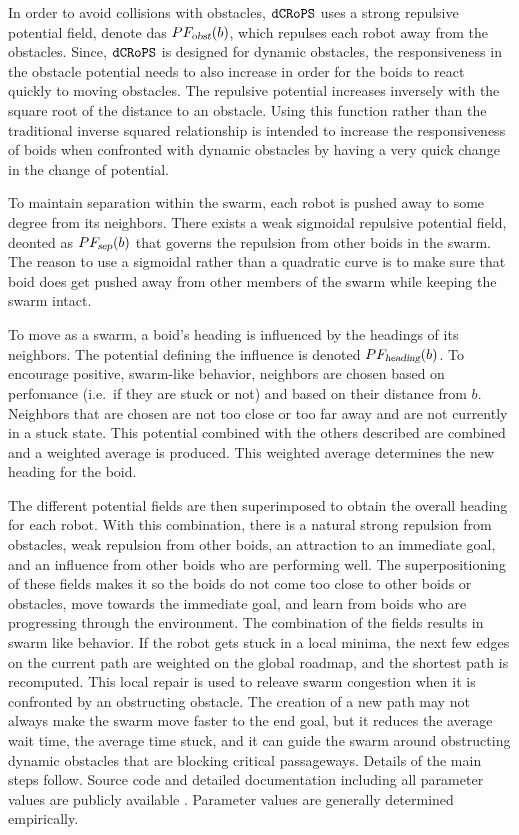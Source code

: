 \documentclass[letterpaper, 10pt, conference]{ieeeconf}
\newcommand{\Acronym}[1]{\ensuremath{{\small{\texttt{#1}}}}}
\newcommand{\Var}[1]{\ensuremath{{\small{\textsl{#1}}}}}
\newcommand{\Name}{\Acronym{dCRoPS}}
\begin{document}
In order to avoid collisions with obstacles, $\Name$ uses a strong repulsive
potential field, denote das $PF_\Var{obst}(b)$, which repulses each robot away
from the obstacles. Since, $\Name$ is designed for dynamic obstacles, the
responsiveness in the obstacle potential needs to also increase in order for
the boids to react quickly to moving obstacles. The repulsive potential
increases inversely with the square root of the distance to an obstacle. Using
this function rather than the traditional inverse squared relationship is
intended to increase the responsiveness of boids when confronted with dynamic
obstacles by having a very quick change in the change of potential.

To maintain separation within the swarm, each robot is pushed away to some
degree from its neighbors. There exists a  weak sigmoidal repulsive potential
field, deonted as $PF_\Var{sep}(b)$ that governs the repulsion from other boids
in the swarm. The reason to use a sigmoidal rather than a quadratic curve is to
make sure that boid does get pushed away from other members of the swarm while
keeping the swarm intact.

To move as a swarm, a boid's heading is influenced by the headings of its
neighbors. The potential defining the influence is denoted
$PF_\Var{heading}(b)$. To encourage positive, swarm-like behavior, neighbors
are chosen based on perfomance (i.e.\ if they are stuck or not) and based on
their distance from $b$. Neighbors that are chosen are not too close or too far
away and are not currently in a stuck state. This potential combined with the
others described are combined and a weighted average is produced. This weighted
average determines the new heading for the boid.

The different potential fields are then superimposed to obtain the overall
heading for each robot. With this combination, there is a natural strong
repulsion from obstacles, weak repulsion from other boids, an attraction to an
immediate goal, and an influence from other boids who are performing well. The
superpositioning of these fields makes it so the boids do not come too close to
other boids or obstacles, move towards the immediate goal, and learn from boids
who are progressing through the environment. The combination of the fields
results in swarm like behavior. If the robot gets stuck in a local minima, the
next few edges on the current path are weighted on the global roadmap, and the
shortest path is recomputed. This local repair is used to releave swarm
congestion when it is confronted by an obstructing obstacle. The creation of a
new path may not always make the swarm move faster to the end goal, but it
reduces the average wait time, the average time stuck, and it can guide the
swarm around obstructing dynamic obstacles that are blocking critical
passageways. {\color{red} Details of the main steps follow. Source code and
detailed documentation including all parameter values are publicly available
\cite{CodeBoids}.  Parameter values are generally determined empirically.}
\end{document}
